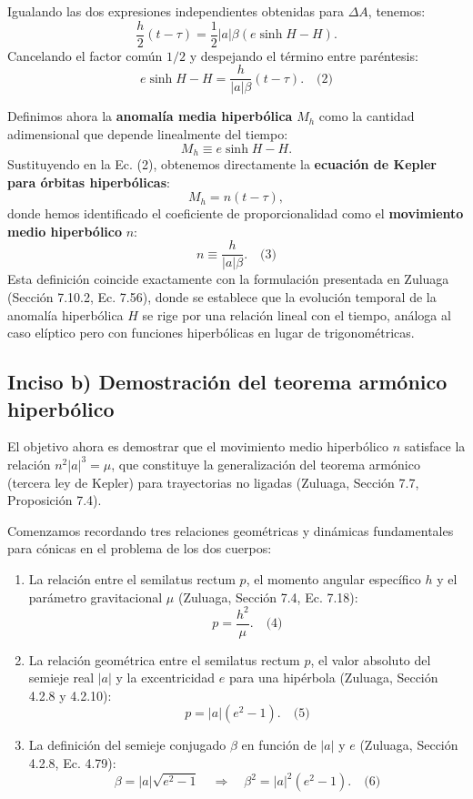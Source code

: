 \documentclass[12pt, a4paper]{article}
\begin{document}
Igualando las dos expresiones independientes obtenidas para $\Delta A$, tenemos:
$$
\frac{h}{2} (t - \tau) = \frac{1}{2} |a| \beta \left( e \sinh H - H \right).
$$
Cancelando el factor común $1/2$ y despejando el término entre paréntesis:
$$
e \sinh H - H = \frac{h}{|a| \beta} (t - \tau). \quad \text{(2)}
$$

Definimos ahora la \textbf{anomalía media hiperbólica} $M_h$ como la cantidad adimensional que depende linealmente del tiempo:
$$
M_h \equiv e \sinh H - H.
$$
Sustituyendo en la Ec. (2), obtenemos directamente la \textbf{ecuación de Kepler para órbitas hiperbólicas}:
$$
M_h = n (t - \tau),
$$
donde hemos identificado el coeficiente de proporcionalidad como el \textbf{movimiento medio hiperbólico} $n$:
$$
n \equiv \frac{h}{|a| \beta}. \quad \text{(3)}
$$
Esta definición coincide exactamente con la formulación presentada en Zuluaga (Sección 7.10.2, Ec. 7.56), donde se establece que la evolución temporal de la anomalía hiperbólica $H$ se rige por una relación lineal con el tiempo, análoga al caso elíptico pero con funciones hiperbólicas en lugar de trigonométricas.

\subsection*{Inciso b) Demostración del teorema armónico hiperbólico}
El objetivo ahora es demostrar que el movimiento medio hiperbólico $n$ satisface la relación $n^2 |a|^3 = \mu$, que constituye la generalización del teorema armónico (tercera ley de Kepler) para trayectorias no ligadas (Zuluaga, Sección 7.7, Proposición 7.4).

Comenzamos recordando tres relaciones geométricas y dinámicas fundamentales para cónicas en el problema de los dos cuerpos:
\begin{enumerate}
    \item La relación entre el semilatus rectum $p$, el momento angular específico $h$ y el parámetro gravitacional $\mu$ (Zuluaga, Sección 7.4, Ec. 7.18):
    $$
    p = \frac{h^2}{\mu}. \quad \text{(4)}
    $$
    \item La relación geométrica entre el semilatus rectum $p$, el valor absoluto del semieje real $|a|$ y la excentricidad $e$ para una hipérbola (Zuluaga, Sección 4.2.8 y 4.2.10):
    $$
    p = |a| (e^2 - 1). \quad \text{(5)}
    $$
    \item La definición del semieje conjugado $\beta$ en función de $|a|$ y $e$ (Zuluaga, Sección 4.2.8, Ec. 4.79):
    $$
    \beta = |a| \sqrt{e^2 - 1} \quad \Longrightarrow \quad \beta^2 = |a|^2 (e^2 - 1). \quad \text{(6)}
    $$
\end{enumerate}
\end{document}
